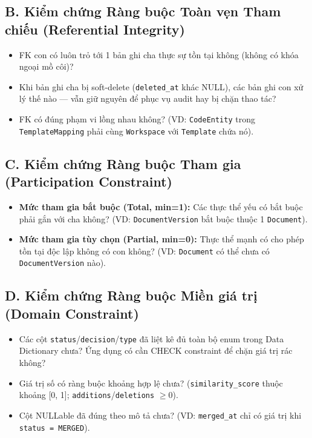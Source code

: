 \subsection{B. Kiểm chứng Ràng buộc Toàn vẹn Tham chiếu (Referential Integrity)}
\begin{itemize}
    \item FK con có luôn trỏ tới 1 bản ghi cha thực sự tồn tại không (không có khóa ngoại mồ côi)?
    \item Khi bản ghi cha bị soft-delete (\texttt{deleted\_at} khác NULL), các bản ghi con xử lý thế nào — vẫn giữ nguyên để phục vụ audit hay bị chặn thao tác?
    \item FK có đúng phạm vi lồng nhau không? (VD: \texttt{CodeEntity} trong \texttt{TemplateMapping} phải cùng \texttt{Workspace} với \texttt{Template} chứa nó).
\end{itemize}

\subsection{C. Kiểm chứng Ràng buộc Tham gia (Participation Constraint)}
\begin{itemize}
    \item \textbf{Mức tham gia bắt buộc (Total, min=1):} Các thực thể yếu có bắt buộc phải gắn với cha không? (VD: \texttt{DocumentVersion} bắt buộc thuộc 1 \texttt{Document}).
    \item \textbf{Mức tham gia tùy chọn (Partial, min=0):} Thực thể mạnh có cho phép tồn tại độc lập không có con không? (VD: \texttt{Document} có thể chưa có \texttt{DocumentVersion} nào).
\end{itemize}

\subsection{D. Kiểm chứng Ràng buộc Miền giá trị (Domain Constraint)}
\begin{itemize}
    \item Các cột \texttt{status}/\texttt{decision}/\texttt{type} đã liệt kê đủ toàn bộ enum trong Data Dictionary chưa? Ứng dụng có cần CHECK constraint để chặn giá trị rác không?
    \item Giá trị số có ràng buộc khoảng hợp lệ chưa? (\texttt{similarity\_score} thuộc khoảng [0, 1]; \texttt{additions}/\texttt{deletions} $\ge 0$).
    \item Cột NULLable đã đúng theo mô tả chưa? (VD: \texttt{merged\_at} chỉ có giá trị khi \texttt{status = MERGED}).
\end{itemize}

